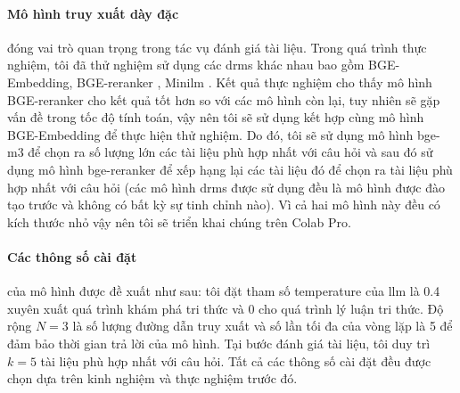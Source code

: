 \paragraph{Mô hình truy xuất dày đặc} đóng vai trò quan trọng trong tác vụ đánh giá tài liệu. Trong quá trình thực nghiệm, tôi đã thử nghiệm sử dụng các \gls{drms} khác nhau bao gồm BGE-Embedding, BGE-reranker \cite{BGE_M3_Embedding2024}, Minilm \cite{wang2020minilmdeepselfattentiondistillation}
. Kết quả thực nghiệm cho thấy mô hình BGE-reranker cho kết quả tốt hơn so với các mô hình còn lại, tuy nhiên sẽ gặp vấn đề trong tốc độ tính toán, vậy nên tôi sẽ sử dụng kết hợp cùng mô hình BGE-Embedding để thực hiện thử nghiệm. Do đó, tôi sẽ sử dụng mô hình bge-m3 để chọn ra số lượng lớn các tài liệu phù hợp nhất với câu hỏi và sau đó sử dụng mô hình bge-reranker để xếp hạng lại các tài liệu đó để chọn ra tài liệu phù hợp nhất với câu hỏi (các mô hình \gls{drms} được sử dụng đều là mô hình được đào tạo trước và không có bất kỳ sự tinh chỉnh nào). Vì cả hai mô hình này đều có kích thước nhỏ vậy nên tôi sẽ triển khai chúng trên Colab Pro.


\paragraph{Các thông số cài đặt} của mô hình được đề xuất như sau: tôi đặt tham số temperature của \gls{llm} là 0.4 xuyên xuất quá trình khám phá tri thức và 0 cho quá trình lý luận tri thức. Độ rộng $N=3$ là số lượng đường dẫn truy xuất và số lần tối đa của vòng lặp là 5 để đảm bảo thời gian trả lời của mô hình. Tại bước đánh giá tài liệu, tôi duy trì $k=5$ tài liệu phù hợp nhất với câu hỏi. Tất cả các thông số cài đặt đều được chọn dựa trên kinh nghiệm và thực nghiệm trước đó.
